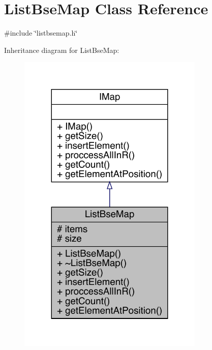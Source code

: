 \hypertarget{a00169}{}\section{List\+Bse\+Map Class Reference}
\label{a00169}


{\ttfamily \#include \char`\"{}listbsemap.\+h\char`\"{}}



Inheritance diagram for List\+Bse\+Map\+:
\nopagebreak
\begin{figure}[H]
\begin{center}
\leavevmode
\includegraphics[width=251pt]{dd/da7/a00168}
\end{center}
\end{figure}


